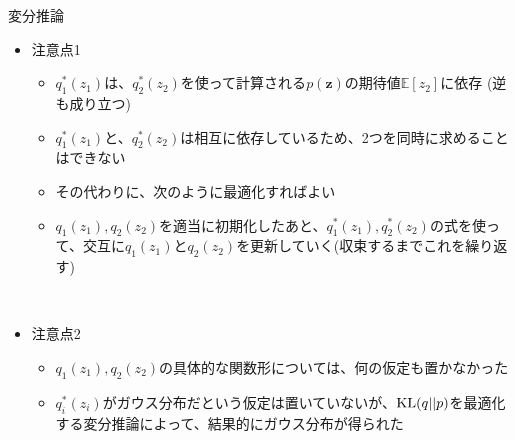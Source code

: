 \documentclass[dvipdfmx,notheorems,t]{beamer}
\begin{document}
\begin{frame}{変分推論}
\begin{itemize}
	\item 注意点1
	\begin{itemize}
		\item $q_1^*(z_1)$は、$q_2^*(z_2)$を使って計算される$p(\bm{z})$の期待値$\mathbb{E}[z_2]$に依存 (逆も成り立つ)
		\item $q_1^*(z_1)$と、$q_2^*(z_2)$は\alert{相互に依存している}ため、2つを同時に求めることはできない
		\item その代わりに、次のように最適化すればよい
		\newline
		\item $q_1(z_1), q_2(z_2)$を適当に初期化したあと、$q_1^*(z_1), q_2^*(z_2)$の式を使って、交互に$q_1(z_1)$と$q_2(z_2)$を更新していく(収束するまでこれを繰り返す)
	\end{itemize} \
	
	\item 注意点2
	\begin{itemize}
		\item $q_1(z_1), q_2(z_2)$の具体的な関数形については、\alert{何の仮定も置かなかった}
		\item $q_i^*(z_i)$がガウス分布だという仮定は置いていないが、$\operatorname{KL} (q || p)$を最適化する\alert{変分推論}によって、\alert{結果的にガウス分布が得られた}
	\end{itemize}
\end{itemize}

\end{frame}
\end{document}
